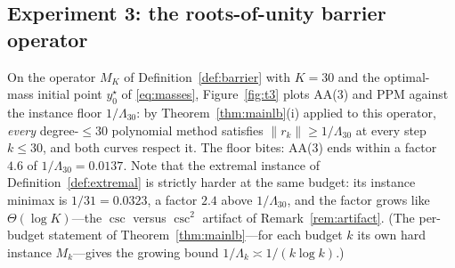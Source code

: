 \documentclass[11pt]{article}
\theoremstyle{definition}
\theoremstyle{remark}
\newcommand{\norm}[1]{\| #1 \|}
\begin{document}
\subsection{Experiment 3: the roots-of-unity barrier operator}
\label{sec:exp2}

On the operator $M_K$ of Definition~\ref{def:barrier} with $K=30$ and the
optimal-mass initial point $y_0^\star$ of \eqref{eq:masses},
Figure~\ref{fig:t3} plots AA(3) and PPM against the instance floor
$1/\Lambda_{30}$: by Theorem~\ref{thm:mainlb}(i) applied to this operator,
\emph{every} degree-$\le30$ polynomial method satisfies
$\norm{r_k}\ge1/\Lambda_{30}$ at every step $k\le30$, and both curves
respect it. The floor bites: AA(3) ends within a factor $4.6$ of
$1/\Lambda_{30}=0.0137$. Note that the extremal instance of
Definition~\ref{def:extremal} is strictly harder at the same budget: its
instance minimax is $1/31=0.0323$, a factor $2.4$ above $1/\Lambda_{30}$,
and the factor grows like $\Theta(\log K)$---the $\csc$ versus $\csc^2$
artifact of Remark~\ref{rem:artifact}. (The per-budget statement of
Theorem~\ref{thm:mainlb}---for each budget $k$ its own hard instance
$M_k$---gives the growing bound $1/\Lambda_k\asymp1/(k\log k)$.)
\end{document}
